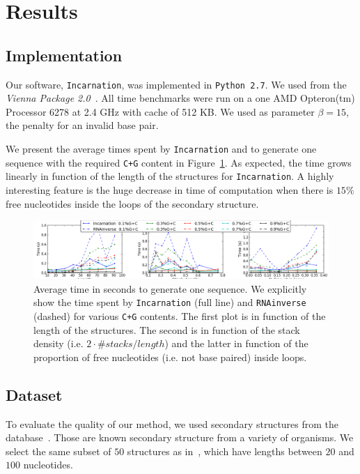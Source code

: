 \section{Results}
\label{sec:results}

\subsection{Implementation}
\label{sec:implementation}
Our software, \texttt{Incarnation}, was implemented in {\tt Python~2.7}. We used
\RNAinverse from the \textit{Vienna Package 2.0}~\cite{Hofacker:1994}.
All time benchmarks were run on a one AMD Opteron(tm) Processor 6278  at 2.4 GHz with cache of 512 KB.
 We used as parameter $\beta=15$, the penalty for an invalid base pair.



We present the average times spent by \texttt{Incarnation} and \RNAinverse to generate one sequence
with the required \texttt{C+G} content in Figure~\ref{fig:time}. As expected, the time grows linearly
in function of the length of the structures for \texttt{Incarnation}.  A highly interesting feature
is the huge decrease in time of computation when there is $15\%$ free 
nucleotides inside the loops of the secondary structure.

\begin{figure}[ht!]
	\centering
	\includegraphics[width=\textwidth]{Figures/time_rnastrand_clustered_rnainverse_100samples_fix}
	\caption{Average time in seconds to generate one sequence. We explicitly show 
	the time spent by \texttt{Incarnation} (full line) and \texttt{RNAinverse} (dashed) for various \texttt{C+G} contents. The first plot is in function
	of the length of the structures. The second is in function of the stack
	density (i.e. $2\cdot\#stacks/length$) and the latter in function of 
	the proportion of free nucleotides (i.e. not base paired) inside loops.}
	\label{fig:time}	
\end{figure}



\subsection{Dataset}
To evaluate the quality of our method, we used secondary
structures from the \RNASTRAND database~\cite{andronescu2008rna}.
Those are known secondary structure from a variety of organisms.
We select the same subset of $50$ structures as in~\cite{Levin:2012kx}, 
which have lengths between $20$ and $100$ nucleotides. 

